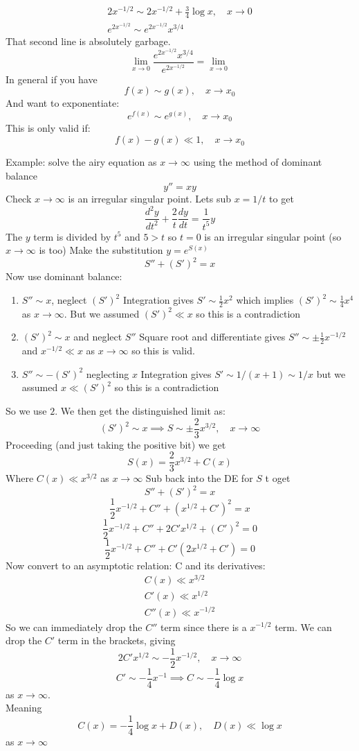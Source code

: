 \documentclass{X:/Documents/Coding/Latex/myassignment}
\begin{document}
\begin{align*}
     2x^{-1/2} \sim 2x^{-1/2} + \frac34 \log x, \quad x\to 0\\
     e^{2x^{-1/2}} \sim e^{2x^{-1/2}} x^{3/4}
\end{align*}
That second line is absolutely garbage.
\[\lim_{x\to 0} \frac{e^{2x^{-1/2}}x^{3/4}}{e^{2x^{-1/2}} } = \lim_{x\to 0}\]
In general if you have 
\[f(x) \sim g(x), \quad x\to x_0\]
And want to exponentiate:
\[e^{f(x)} \sim e^{g(x)}, \quad x\to x_0\]
This is only valid if:
\[f(x) - g(x) \ll 1,\quad x\to x_0\]


Example: solve the airy equation as $x\to \infty$ using the method of dominant balance
\[y'' = xy\]
Check $x\to \infty$ is an irregular singular point. Lets sub $x=1/t$ to get
\[\frac{d^2y}{dt^2} + \frac2t \frac{dy}{dt} = \frac1{t^5}y\]
The $y$ term is divided by $t^5$ and $5>t$ so $t=0$ is an irregular singular point (so $x \to \infty$ is too)
Make the substitution $y = e^{S(x)}$
\[S'' + (S')^2 = x\]
Now use dominant balance:
\begin{enumerate}
    \item $S''\sim x$, neglect $(S')^2$
    Integration gives $S' \sim \frac12 x^2$ which implies $(S')^2 \sim \frac14 x^4$ as $x\to \infty$. But we assumed $(S')^2 \ll x$ so this is a contradiction
    \item $(S')^2 \sim x$ and neglect $S''$
    Square root and differentiate gives $S'' \sim \pm \frac12 x^{-1/2}$ and $x^{-1/2} \ll x$ as $x\to \infty$ so this is valid.
    \item $S'' \sim -(S')^2$ neglecting $x$
    Integration gives $S'\sim 1/(x+1) \sim 1/x$ but we assumed $x \ll (S')^2$ so this is a contradiction
\end{enumerate}
So we use $2$. 
We then get the distinguished limit as:
\[(S')^2 \sim x \implies S \sim \pm \frac23 x^{3/2}, \quad x\to \infty\]
Proceeding (and just taking the positive bit) we get
\[S(x) = \frac23 x^{3/2} + C(x)\]
Where $C(x) \ll x^{3/2}$ as $x\to\infty$
Sub back into the DE for $S$ t oget
\[S'' + (S')^2 = x\]
\[\frac12 x^{-1/2} + C'' + (x^{1/2} + C' )^2 = x\]
\[\frac12 x^{-1/2} + C'' + 2C'x^{1/2} + (C')^2=0\]
\[\frac12 x^{-1/2} + C'' + C'(2x^{1/2} + C')=0\]
Now convert to an asymptotic relation:
C and its derivatives:
\begin{align*}
    C(x) \ll x^{3/2}\\
    C'(x) \ll x^{1/2}\\
    C''(x) \ll x^{-1/2}
\end{align*}
So we can immediately drop the $C''$ term since there is a $x^{-1/2}$ term. We can drop the $C'$ term in the brackets, giving
\[2C' x^{1/2} \sim - \frac12 x^{-1/2}, \quad x\to \infty\]
\[C' \sim -\frac14 x^{-1} \implies C \sim - \frac14 \log x\]
as $x\to \infty$.\\
Meaning
\[C(x) = -\frac14 \log x + D(x), \quad D(x) \ll \log x\]
as $x\to \infty$
\end{document}
